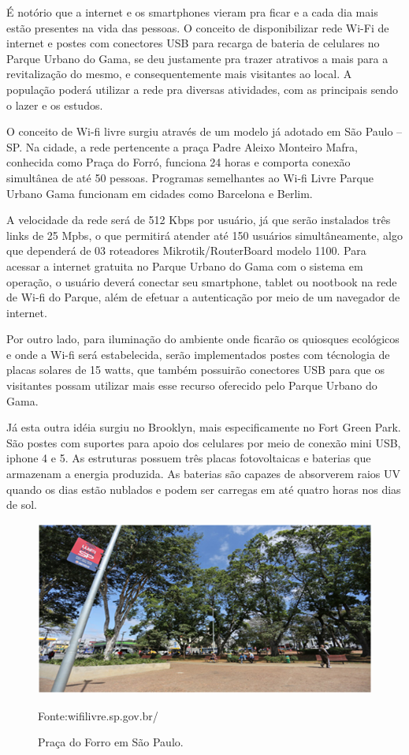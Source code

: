 	É notório que a internet e os smartphones vieram pra ficar e a cada dia mais estão  presentes na vida das pessoas. O conceito de disponibilizar rede Wi-Fi de internet e postes com conectores USB para recarga de bateria de celulares no Parque Urbano do Gama, se deu justamente pra trazer atrativos a mais para a revitalização do mesmo, e consequentemente mais visitantes ao local. A população poderá utilizar a rede pra diversas atividades, com as principais sendo o lazer e os estudos.

	O conceito de Wi-fi livre surgiu através de um modelo já adotado em São Paulo – SP. Na cidade, a rede pertencente a praça Padre Aleixo Monteiro Mafra, conhecida como Praça do Forró, funciona 24 horas e comporta conexão simultânea de até 50 pessoas. Programas semelhantes ao Wi-fi Livre Parque Urbano Gama funcionam em cidades como Barcelona e Berlim. 	

	A velocidade da rede será de 512 Kbps por usuário, já que serão instalados três links de 25 Mpbs, o que permitirá atender até 150 usuários simultâneamente, algo que dependerá de 03 roteadores Mikrotik/RouterBoard modelo 1100. Para acessar a internet gratuita no Parque Urbano do Gama com o sistema em operação, o usuário deverá conectar seu smartphone, tablet ou nootbook na rede de Wi-fi do Parque, além de efetuar a autenticação por meio de um navegador de internet.
		
	Por outro lado, para iluminação do ambiente onde ficarão os quiosques ecológicos e onde a Wi-fi será estabelecida, serão implementados postes com técnologia de placas solares de 15 watts, que também possuirão conectores USB para que os visitantes possam utilizar mais esse recurso oferecido pelo Parque Urbano do Gama.
	
	Já esta outra idéia surgiu no Brooklyn, mais especificamente no Fort Green Park. São postes com suportes para apoio dos celulares por meio de conexão mini USB, iphone 4 e 5. As estruturas possuem três placas fotovoltaicas e baterias que armazenam a energia produzida. As baterias são  capazes de absorverem raios UV quando os dias estão nublados e podem ser carregas em até quatro horas nos dias de sol.

\begin{figure}[H]
	 \centering
	\label{Praça do forró em São Paulo}
	 \includegraphics[keepaspectratio=true,scale=0.8]{interacao/25.png}
	 \caption{Praça do Forro em São Paulo.}
	 \small{Fonte:wifilivre.sp.gov.br/}
\end{figure}

